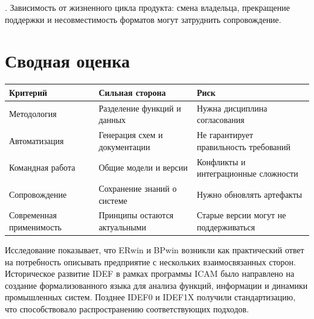 \documentclass[essaypaper,paper]{pmk-graduate}
\begin{document}
. Зависимость от жизненного цикла продукта: смена владельца, прекращение поддержки и несовместимость форматов могут затруднить сопровождение.\par

\section{Сводная оценка}

\small

\setlength{\tabcolsep}{4pt}

\renewcommand{\arraystretch}{1.15}

\begin{longtable}{|p{}|p{}|p{}|}

\hline

\textbf{Критерий} & \textbf{Сильная сторона} & \textbf{Риск} \\ \hline

Методология & Разделение функций и данных & Нужна дисциплина согласования \\ \hline

Автоматизация & Генерация схем и документации & Не гарантирует правильность требований \\ \hline

Командная работа & Общие модели и версии & Конфликты и интеграционные сложности \\ \hline

Сопровождение & Сохранение знаний о системе & Нужно обновлять артефакты \\ \hline

Современная применимость & Принципы остаются актуальными & Старые версии могут не поддерживаться \\ \hline

\end{longtable}

\normalsize

\conclusion

Исследование показывает, что ERwin и BPwin возникли как практический ответ на потребность описывать предприятие с нескольких взаимосвязанных сторон. Историческое развитие IDEF в рамках программы ICAM было направлено на создание формализованного языка для анализа функций, информации и динамики промышленных систем. Позднее IDEF0 и IDEF1X получили стандартизацию, что способствовало распространению соответствующих подходов.

\par
\end{document}
